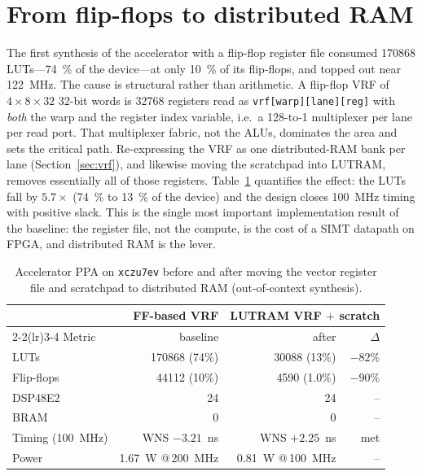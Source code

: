 \documentclass[12pt,a4paper,oneside]{report}
\newcommand{\code}[1]{\texttt{#1}}
\begin{document}
\section{From flip-flops to distributed RAM}
\label{sec:lutram}
The first synthesis of the accelerator with a flip-flop register file consumed
\SI{170868}{} LUTs---\SI{74}{\percent} of the device---at only \SI{10}{\percent}
of its flip-flops, and topped out near \SI{122}{\mega\hertz}. The cause is
structural rather than arithmetic. A flip-flop VRF of $4\times8\times32$ 32-bit
words is \num{32768} registers read as \code{vrf[warp][lane][reg]} with
\emph{both} the warp and the register index variable, i.e.\ a 128-to-1
multiplexer per lane per read port. That multiplexer fabric, not the ALUs,
dominates the area and sets the critical path. Re-expressing the VRF as one
distributed-RAM bank per lane (Section~\ref{sec:vrf}), and likewise moving the
scratchpad into LUTRAM, removes essentially all of those registers.
Table~\ref{tab:ppa_base} quantifies the effect: the LUTs fall by $5.7\times$
(\SI{74}{\percent} to \SI{13}{\percent} of the device) and the design closes
\SI{100}{\mega\hertz} timing with positive slack. This is the single most
important implementation result of the baseline: the register file, not the
compute, is the cost of a SIMT datapath on FPGA, and distributed RAM is the lever.

\begin{table}[t]
\caption{Accelerator PPA on \code{xczu7ev} before and after moving the vector
register file and scratchpad to distributed RAM (out-of-context synthesis).}
\label{tab:ppa_base}
\centering
\small
\begin{tabular}{lrrr}
\toprule
 & FF-based VRF & \multicolumn{2}{c}{LUTRAM VRF $+$ scratch}\\
\cmidrule(lr){2-2}\cmidrule(lr){3-4}
Metric & baseline & after & $\Delta$\\
\midrule
LUTs             & \num{170868} (74\%) & \num{30088} (13\%) & $-82\%$\\
Flip-flops       & \num{44112} (10\%)  & \num{4590} (1.0\%) & $-90\%$\\
DSP48E2          & 24                  & 24                 & --\\
BRAM             & 0                   & 0                  & --\\
Timing (\SI{100}{\mega\hertz}) & WNS $-3.21$~ns & WNS $+2.25$~ns & met\\
Power            & 1.67~W @\,200~MHz   & 0.81~W @\,100~MHz  & --\\
\bottomrule
\end{tabular}
\end{table}
\end{document}
